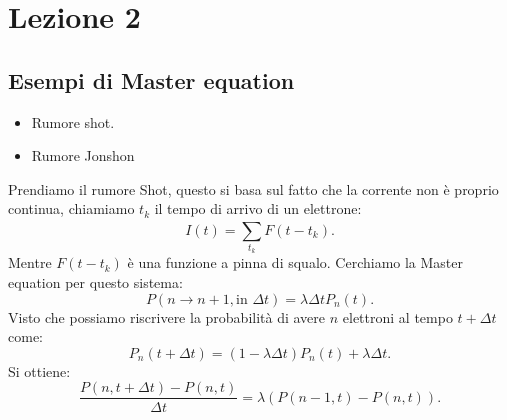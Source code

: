 \section{Lezione 2}%
\label{sub:Lezione 2}

\subsection{Esempi di Master equation}%
\begin{itemize}
    \item Rumore shot.
    \item Rumore Jonshon
\end{itemize}
Prendiamo il rumore Shot, questo si basa sul fatto che la corrente non è proprio continua, chiamiamo $t_k$ il tempo di arrivo di un elettrone:
\[
    I(t) = \sum_{t_k}^{} F(t-t_k) 
.\] 
Mentre $F(t-t_k)$ è una funzione a pinna di squalo. Cerchiamo la Master equation per questo sistema:
\[
    P(n\to n+1, \text{in }\Delta  t) = \lambda \Delta tP_n(t) 
.\] 
Visto che possiamo riscrivere la probabilità di avere $n$ elettroni al tempo $t+\Delta t$ come: 
\[
    P_n(t+\Delta  t) = \left(1-\lambda\Delta t\right)P_n(t) + \lambda\Delta t 
.\] 
Si ottiene:
\[
    \frac{P(n, t+\Delta  t) - P(n,t)}{\Delta t} = \lambda (P(n-1,t) -P(n,t)) 
.\] 
